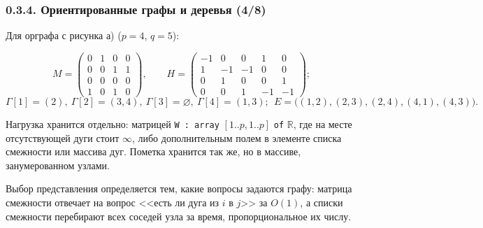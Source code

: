 \documentclass[mathserif,12pt,aspectratio=169]{beamer}
\begin{document}
\begin{frame}
\frametitle{0.3.4. Ориентированные графы и деревья (4/8)}

\begin{example}
Для орграфа с рисунка а) ($p=4$, $q=5$):
\end{example}
\vspace{-14pt}
$$M=\begin{pmatrix}0&1&0&0\\0&0&1&1\\0&0&0&0\\1&0&1&0\end{pmatrix}\!,\qquad
H=\begin{pmatrix}-1&0&0&1&0\\1&-1&-1&0&0\\0&1&0&0&1\\0&0&1&-1&-1\end{pmatrix}\!;$$
\vspace{-12pt}
$$\Gamma[1]=(2),\ \Gamma[2]=(3,4),\ \Gamma[3]=\varnothing,\ \Gamma[4]=(1,3);
\ \ E=\big((1,2),(2,3),(2,4),(4,1),(4,3)\big).$$
\vspace{-18pt}

Нагрузка хранится отдельно: матрицей \texttt{W : array} $[1..p,1..p]$
\texttt{of} $\mathbb{R}$, где на месте отсутствующей дуги стоит $\infty$, либо
дополнительным полем в элементе списка смежности или массива дуг. Пометка
хранится так же, но в массиве, занумерованном узлами.

\begin{remark}
Выбор представления определяется тем, какие вопросы задаются графу: матрица
смежности отвечает на вопрос <<есть ли дуга из $i$ в $j$>> за $O(1)$, а списки
смежности перебирают всех соседей узла за время, пропорциональное их числу.
\end{remark}
\end{frame}
\end{document}
